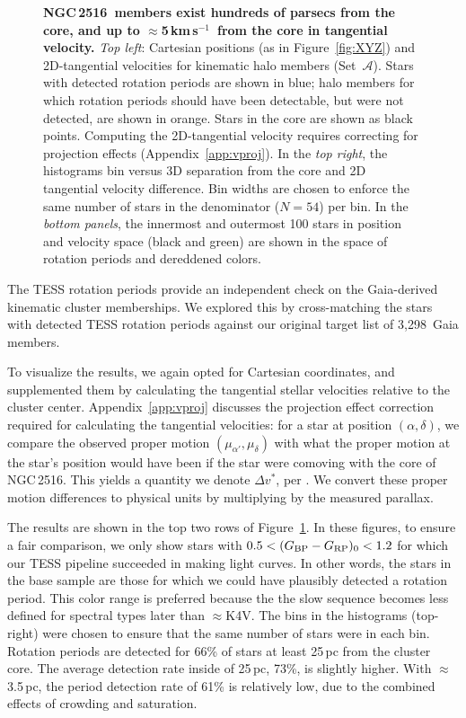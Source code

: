 \documentclass[12pt,twocolumn,tighten]{aastex63}
\newcommand{\cn}{NGC\,2516} %
\newcommand{\nkinematic}{3{,}298} %
\newcommand{\kms}{\,km\,s$^{-1}$}
\newcommand{\bpmrpo}{(G_{\rm BP}-G_{\rm RP})_0}
\begin{document}
\begin{figure}[t]
\begin{center}
	\end{center}
	\vspace{-0.7cm}
  \caption{ 
  {\bf \cn\ members exist hundreds of parsecs from the core, and up
  to $\approx$5\kms\ from the core in tangential velocity.} {\it Top
  left}: Cartesian positions (as in Figure~\ref{fig:XYZ}) and
  2D-tangential velocities for kinematic halo members
  (Set~$\mathcal{A}$).  Stars with detected rotation periods are shown
  in blue;  halo members for which rotation periods should have been
  detectable, but were not detected, are shown in orange.  Stars in
  the core are shown as black points.  Computing the 2D-tangential
  velocity requires correcting for projection effects
  (Appendix~\ref{app:vproj}).  In the {\it top right}, the histograms
  bin versus 3D separation from the core and 2D tangential velocity
  difference.  Bin widths are chosen to enforce the same number of
  stars in the denominator ($N=54$) per bin.  In the {\it bottom
  panels}, the innermost and outermost 100 stars in position and
  velocity space (black and green) are shown in the space of rotation
  periods and dereddened colors.
  \label{fig:physical_x_rotn}
	}
\end{figure}

The TESS rotation periods provide an independent check on the
Gaia-derived kinematic cluster memberships.  We explored this by
cross-matching the stars with detected TESS rotation periods against
our original target list of \nkinematic\ Gaia members.  

To visualize the results, we again opted for Cartesian coordinates,
and supplemented them by calculating the tangential stellar velocities
relative to the cluster center.  Appendix~\ref{app:vproj} discusses
the projection effect correction required for calculating the
tangential velocities: for a star at position $(\alpha, \delta)$, we
compare the observed proper motion $(\mu_{\alpha'}, \mu_\delta)$ with
what the proper motion at the star's position would have been if the
star were comoving with the core of \cn.  This yields a quantity we
denote $\Delta v^{*}$, per .  We convert
these proper motion differences to physical units by multiplying by
the measured parallax.  

The results are shown in the top two rows of
Figure~\ref{fig:physical_x_rotn}.  In these figures, to ensure a fair
comparison, we only show stars with $0.5<\bpmrpo<1.2$ for which our
TESS pipeline succeeded in making light curves.  In other words, the
stars in the base sample are those for which we could have plausibly
detected a rotation period.  This color range is preferred because the
the slow sequence becomes less defined for spectral types later than
$\approx$K4V.  The bins in the histograms (top-right) were chosen to
ensure that the same number of stars were in each bin.  Rotation
periods are detected for 66\% of stars at least 25\,pc from the
cluster core.  The average detection rate inside of 25\,pc, 73\%, is
slightly higher.  With $\approx$3.5\,pc, the period detection rate of
61\% is relatively low, due to the combined effects of crowding and
saturation.
\end{document}
